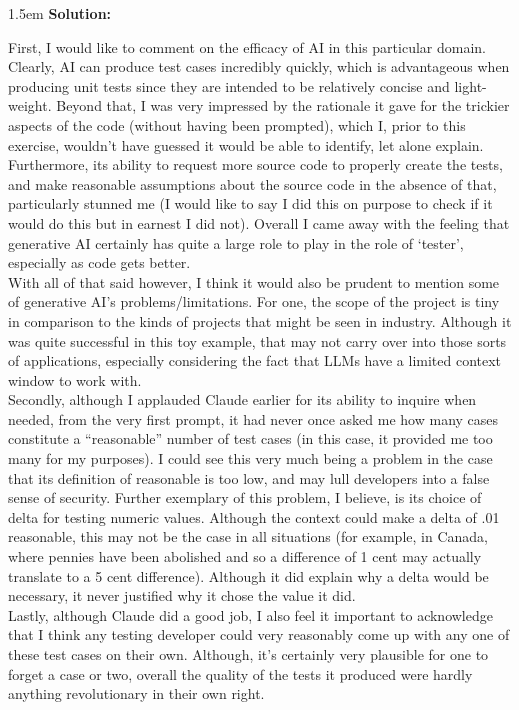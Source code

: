 \documentclass[10pt]{article}
\newenvironment{solution}{
	\vspace{.5em}
	\par
	\begin{adjustwidth}{1.5em}{}
	\textbf{{Solution:}}
	\par
	\vspace{.5em}
}{
	\vspace{1em}
	\end{adjustwidth}
}
\begin{document}
\begin{solution}
	First, I would like to comment on the efficacy of AI in this particular domain. Clearly, AI can produce test cases incredibly quickly, which is advantageous when producing unit tests since they are intended to be relatively concise and light-weight. Beyond that, I was very impressed by the rationale it gave for the trickier aspects of the code (without having been prompted), which I, prior to this exercise, wouldn't have guessed it would be able to identify, let alone explain. Furthermore, its ability to request more source code to properly create the tests, and make reasonable assumptions about the source code in the absence of that, particularly stunned me (I would like to say I did this on purpose to check if it would do this but in earnest I did not). Overall I came away with the feeling that generative AI certainly has quite a large role to play in the role of `tester', especially as code gets better. \\

	With all of that said however, I think it would also be prudent to mention some of generative AI's problems/limitations. For one, the scope of the project is tiny in comparison to the kinds of projects that might be seen in industry. Although it was quite successful in this toy example, that may not carry over into those sorts of applications, especially considering the fact that LLMs have a limited context window to work with. \\

	Secondly, although I applauded Claude earlier for its ability to inquire when needed, from the very first prompt, it had never once asked me how many cases constitute a ``reasonable'' number of test cases (in this case, it provided me too many for my purposes). I could see this very much being a problem in the case that its definition of reasonable is too low, and may lull developers into a false sense of security. Further exemplary of this problem, I believe, is its choice of delta for testing numeric values. Although the context could make a delta of .01 reasonable, this may not be the case in all situations (for example, in Canada, where pennies have been abolished and so a difference of 1 cent may actually translate to a 5 cent difference). Although it did explain why a delta would be necessary, it never justified why it chose the value it did. \\

	Lastly, although Claude did a good job, I also feel it important to acknowledge that I think any testing developer could very reasonably come up with any one of these test cases on their own. Although, it's certainly very plausible for one to forget a case or two, overall the quality of the tests it produced were hardly anything revolutionary in their own right. \\


\end{solution}
\end{document}
